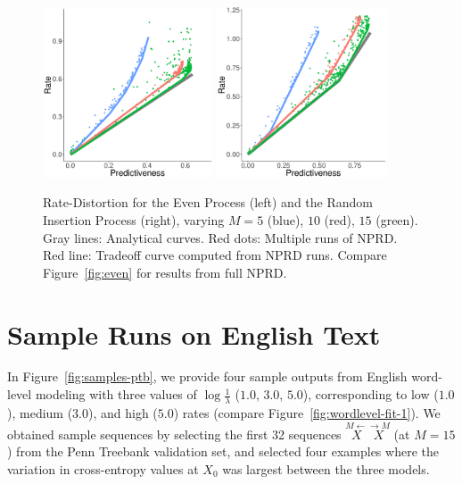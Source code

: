 \documentclass[entropy,article,submit,moreauthors,pdftex,10pt,a4paper]{Definitions/mdpi}
\newcommand{\finitefuture}{\stackrel{\rightarrow \scriptscriptstyle{M}}{X}}
\newcommand{\finitepast}{\stackrel{\scriptscriptstyle{M}\leftarrow}{X}}%
\begin{document}
\begin{figure}
\centering
\includegraphics[width=0.45\textwidth]{code/figures/even-info-varyM.pdf}
\includegraphics[width=0.45\textwidth]{code/figures/rip-info-varyM.pdf}

	\caption{Rate-Distortion for the Even Process (left) and the Random Insertion Process (right), varying $M=5$ (blue), $10$ (red), $15$ (green). Gray lines: Analytical curves. Red dots: Multiple runs of NPRD. Red line: Tradeoff curve computed from NPRD runs. Compare Figure~\ref{fig:even} for results from full NPRD.}\label{fig:even-varyM}
\end{figure}


\section{Sample Runs on English Text}\label{sec:english-samples}



In Figure~\ref{fig:samples-ptb}, we provide four sample outputs from English word-level modeling with three values of $\log \frac{1}{\lambda}$ ($1.0$, $3.0$, $5.0$), corresponding to low ($1.0$), medium ($3.0$), and high ($5.0$) rates  (compare Figure~\ref{fig:wordlevel-fit-1}).
We obtained sample sequences by selecting the first 32 sequences $\finitepast\finitefuture$ (at $M=15$) from the Penn Treebank validation set, and selected four examples where the variation in cross-entropy values at $X_0$ was largest between the three models.
\end{document}
